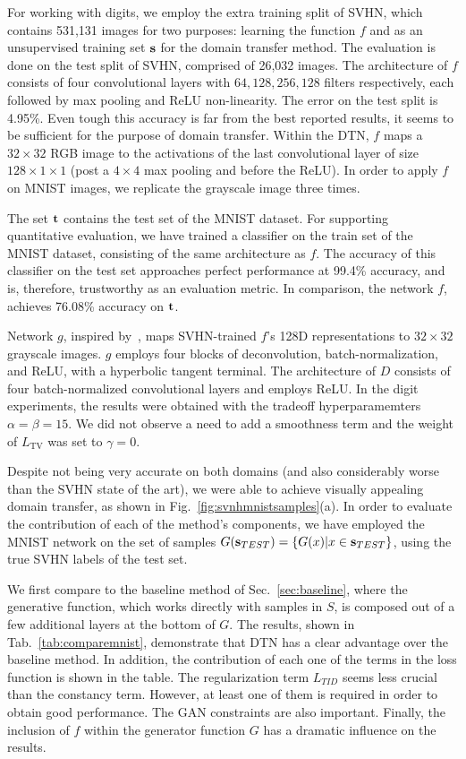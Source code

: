 \documentclass{article} \usepackage{iclr2017_conference,times}
\begin{document}
For working with digits, we employ the extra training split of SVHN, which contains 531,131 images for two purposes: learning the function $f$ and as an unsupervised training set $\textbf s$ for the domain transfer method. The evaluation is done on the test split of SVHN, comprised of 26,032 images. The architecture of $f$ consists of four convolutional layers with ${64, 128, 256,128}$ filters respectively, each followed by max pooling and ReLU non-linearity. The error on the test split is 4.95\%. Even tough this accuracy is far from the best reported results, it seems to be sufficient for the purpose of domain transfer. Within the DTN, $f$ maps a $32 \times 32$ RGB image to the activations of the last convolutional layer of size $128 \times 1 \times 1$ (post a $4 \times 4$ max pooling and before the ReLU). In order to apply $f$ on MNIST images, we replicate the grayscale image three times.

The set $\textbf t$ contains the test set of the MNIST dataset. For supporting quantitative evaluation, we have trained a classifier on the train set of the MNIST dataset, consisting of the same architecture as $f$. The accuracy of this classifier on the test set approaches perfect performance at 99.4\% accuracy, and is, therefore, trustworthy as an evaluation metric. In comparison, the network $f$, achieves 76.08\% accuracy on $\textbf t$. 

Network $g$, inspired by~\cite{dcgan}, maps SVHN-trained $f$'s 128D representations to $32 \times 32$ grayscale images. $g$ employs four blocks of deconvolution, batch-normalization, and ReLU, with a hyperbolic tangent terminal. The architecture of $D$ consists of four batch-normalized convolutional layers and employs ReLU. In the digit experiments, the results were obtained with the tradeoff hyperparamemters $\alpha=\beta=15$. We did not observe a need to add a smoothness term and the weight of $L_\text{TV}$ was set to $\gamma=0$. 

Despite not being very accurate on both domains (and also considerably worse than the SVHN state of the art), we were able to achieve visually appealing domain transfer, as shown in Fig.~\ref{fig:svnhmnistsamples}(a). In order to evaluate the contribution of each of the method's components, we have employed the MNIST network on the set of samples $G(\textbf s_{TEST})=\{G(x)|x\in \mathbf s_{TEST}\}$, using the true SVHN labels of the test set. 

We first compare to the baseline method of Sec.~\ref{sec:baseline}, where the generative function, which works directly with samples in $S$, is composed out of a few additional layers at the bottom of $G$. The results, shown in Tab.~\ref{tab:comparemnist}, demonstrate that DTN has a clear advantage over the baseline method. In addition, the contribution of each one of the terms in the loss function is shown in the table. The regularization term $L_{TID}$ seems less crucial than the constancy term. However, at least one of them is required in order to obtain good performance. The GAN constraints are also important. Finally, the inclusion of $f$ within the generator function $G$ has a dramatic influence on the results. 
\end{document}
